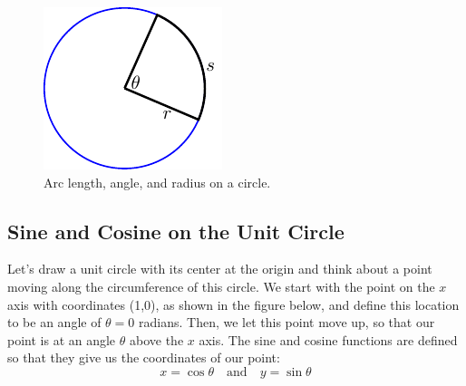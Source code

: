 \begin{figure}
    \begin{center}
        \includegraphics[width=0.3\columnwidth]{figures/0-5-fig3.pdf}
    \end{center}
    \caption{Arc length, angle, and radius on a circle.}
    \label{fig:0.5.arc}
\end{figure}


\subsection*{Sine and Cosine on the Unit Circle}

Let's draw a unit circle with its center at the origin and think about a point moving along the circumference of this circle.  We start with the point on the $x$ axis with coordinates (1,0), as shown in the figure below, and define this location to be an angle of $\theta = 0$ radians.  Then, we let this point move up, so that our point is at an angle $\theta$ above the $x$ axis.  The sine and cosine functions are defined so that they give us the coordinates of our point:   
\[ x = \cos \theta \quad \text{and} \quad y = \sin \theta \]


